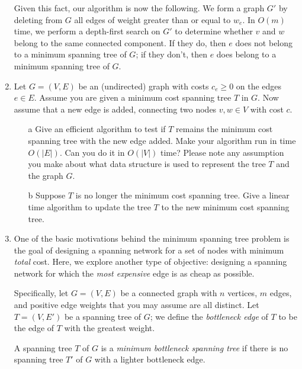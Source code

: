 \documentclass[12pt]{article}
\begin{document}
\begin{enumerate}
{Given this fact, our algorithm is now the following.
We form a graph $G'$ by deleting from $G$ all 
edges of weight greater than or equal to $w_e$.
In $O(m)$ time, we perform a depth-first search on $G'$
to determine whether $v$ and $w$ belong to the
same connected component.
If they do, then $e$ does not belong to a minimum spanning tree of $G$;
if they don't, then $e$ does belong to a minimum spanning tree of $G$.
}



\item 

Let $G=(V,E)$ be an (undirected) graph with 
costs $c_e \ge 0$ on the edges $e \in E$. Assume you are given a 
minimum cost spanning tree $T$ in $G$. Now assume that a new edge 
is added, connecting two nodes $v,w \in V$ with cost $c$.
\begin{itemize}
\item[a] Give an efficient algorithm to test if $T$ remains the minimum
cost spanning tree with the new edge added. Make your algorithm run in 
time $O(|E|)$. Can you do it in $O(|V|)$ time? Please note any 
assumption  you make about what data structure is used 
to represent the tree $T$ and the graph $G$.
\item[b] Suppose $T$ is no longer the minimum cost spanning tree. 
Give a linear time algorithm to update the tree $T$ to the new minimum cost 
spanning tree.
\end{itemize}



\item 

One of the basic motivations behind the minimum
spanning tree problem is the goal of designing a spanning
network for a set of nodes with minimum {\em total} cost.
Here, we explore another type of objective:
designing a spanning network for which the {\em most expensive} edge
is as cheap as possible.

Specifically, let $G = (V,E)$ be a connected graph with
$n$ vertices, $m$ edges, and positive edge weights that you may
assume are all distinct.
Let $T = (V,E')$ be a spanning tree of $G$; we define
the {\em bottleneck edge} of $T$ to be the edge of $T$
with the greatest weight.

A spanning tree $T$ of $G$ is a {\em minimum bottleneck spanning tree}
if there is no spanning tree $T'$ of $G$ with a lighter
bottleneck edge.


\end{enumerate}
\end{document}

